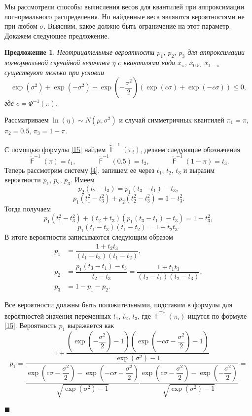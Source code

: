 \documentclass[12pt]{article}
\newtheorem{proposition}[theorem]{Предложение}
\newenvironment{Proof}{\par\noindent{\bf Доказательство.}}{\hfill$\scriptstyle\blacksquare$}
\DeclareMathOperator{\F}{\mathsf{F}}
\begin{document}
	Мы рассмотрели способы вычисления весов для квантилей при аппроксимации логнормального распределения. Но найденные веса являются вероятностями не при любом $\sigma$. Выясним, какое должно быть ограничение на этот параметр. Докажем следующее предложение.
	\begin{proposition}\label{pr5}
		Неотрицательные вероятности $p_{1}$, $p_{2}$, $p_{3}$ для аппроксимации логнормальной случайной величины $\eta$ с квантилями вида $x_{\pi}$, $x_{0.5}$, $x_{1-\pi}$ существуют только при условии
		\begin{equation}
			\exp(\sigma^{2})+\exp(-\sigma^{2})-\exp\left( -\dfrac{\sigma^{2}}{2}\right) (\exp(c\sigma)+\exp(-c\sigma))\leq 0, \label{16}
		\end{equation}
		где $c = \Phi^{-1}(\pi)$.
	\end{proposition}
	\begin{Proof}
		Рассматриваем $\ln(\eta) \sim N(\mu, \sigma^{2})$ и случай симметричныx квантилей $\pi_{1} = \pi$, $\pi_{2} = 0.5$, $\pi_{3} = 1-\pi$.

		С помощью формулы \eqref{15} найдем $\displaystyle{\tilde{\F}^{-1}(\pi_{i})}$, делаем следующие обозначения
		\[\tilde{\F}^{-1}(\pi) = t_{1}, \quad\quad\quad \tilde{\F}^{-1}(0.5) = t_{2}, \quad\quad\quad \tilde{\F}^{-1}(1-\pi) = t_{3}.\]
		Теперь рассмотрим систему \eqref{4}, запишем ее через $t_{1}$, $t_{2}$, $t_{3}$ и выразим вероятности $p_{1}$, $p_{2}$, $p_{3}$. Имеем 
		\[p_{2}(t_{2}-t_{3})=p_{1}(t_{3}-t_{1})-t_{3},\]
		\[p_{1}(t_{1}^{2}-t_{3}^{2}) + p_{2}(t_{2}^{2} - t_{3}^{2})=1-t_{3}^{2}.\]
		Тогда получаем
		\[p_{1}(t_{1}^{2}-t_{3}^{2}) + (t_{2}+t_{3})(p_{1}(t_{3}-t_{1})-t_{3})=1-t_{3}^{2},\]
		\[p_{1}(t_{1}-t_{3})(t_{1}-t_{2})=1+t_{2}t_{3}.\]
		В итоге вероятности записываются следующим образом 
		\begin{align}
			p_{1} &= \dfrac{1+t_{2}t_{3}}{(t_{1}-t_{3})(t_{1}-t_{2})}, \label{17}\\
			p_{2} &= \dfrac{p_{1}(t_{3}-t_{1})-t_{3}}{t_{2}-t_{3}}=\dfrac{1+t_{1}t_{3}}{(t_{2}-t_{1})(t_{2}-t_{3})}, \label{18}\\
			p_{3} &= 1-p_{1}-p_{2}. \label{19}
		\end{align}
		
		Все вероятности должны быть положительными, подставим в формулы для вероятностей значения переменных $t_{1}$, $t_{2}$, $t_{3}$, где $\tilde{\F}^{-1}(\pi_{i})$ ищутся по формуле \eqref{15}. Вероятность $p_{1}$ выражается как
		\[p_{1}=\dfrac{1+\dfrac{\left( \exp\left( -\dfrac{\sigma^{2}}{2}\right) -1\right) \left( \exp\left(-c\sigma-\dfrac{\sigma^{2}}{2}\right) -1\right) }{\exp(\sigma^{2})-1}}{\dfrac{\exp\left(c\sigma-\dfrac{\sigma^{2}}{2}\right) -\exp\left( -c\sigma-\dfrac{\sigma^{2}}{2}\right) }{\sqrt{\exp(\sigma^{2})-1}}\dfrac{\exp\left( c\sigma-\dfrac{\sigma^{2}}{2}\right) -\exp\left( -\dfrac{\sigma^{2}}{2}\right) }{\sqrt{\exp(\sigma^{2})-1}}}=\]
		

\end{Proof}
\end{document}
